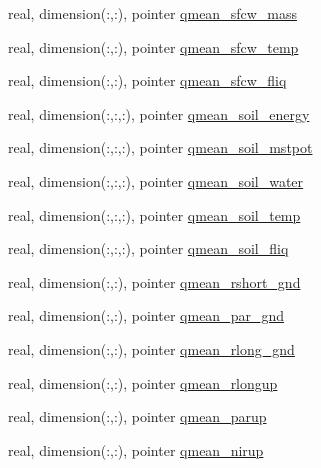 \begin{DoxyCompactItemize}
real, dimension(\+:,\+:), pointer \hyperlink{structed__state__vars_1_1edtype_aaa3a2201b6c25eaf9300a541aeb7d8fb}{qmean\+\_\+sfcw\+\_\+mass}
\item 
real, dimension(\+:,\+:), pointer \hyperlink{structed__state__vars_1_1edtype_ac67ca688691a81933b41003e199160a7}{qmean\+\_\+sfcw\+\_\+temp}
\item 
real, dimension(\+:,\+:), pointer \hyperlink{structed__state__vars_1_1edtype_ad9100ff1e977f24b5cdaf4b8cb18574d}{qmean\+\_\+sfcw\+\_\+fliq}
\item 
real, dimension(\+:,\+:,\+:), pointer \hyperlink{structed__state__vars_1_1edtype_a2fcbe89f1e75f447768d0f403c0e6b6f}{qmean\+\_\+soil\+\_\+energy}
\item 
real, dimension(\+:,\+:,\+:), pointer \hyperlink{structed__state__vars_1_1edtype_a3b45ea7cbbd8fba8041c0edf23517dc9}{qmean\+\_\+soil\+\_\+mstpot}
\item 
real, dimension(\+:,\+:,\+:), pointer \hyperlink{structed__state__vars_1_1edtype_aae05e420e3d423e4929e7f3b5e5cd79a}{qmean\+\_\+soil\+\_\+water}
\item 
real, dimension(\+:,\+:,\+:), pointer \hyperlink{structed__state__vars_1_1edtype_a65b006a88c42265d23c56ebe8f93e9b7}{qmean\+\_\+soil\+\_\+temp}
\item 
real, dimension(\+:,\+:,\+:), pointer \hyperlink{structed__state__vars_1_1edtype_abedf8035a26cf42bb7cad2d0f6b1b358}{qmean\+\_\+soil\+\_\+fliq}
\item 
real, dimension(\+:,\+:), pointer \hyperlink{structed__state__vars_1_1edtype_a6ee891e99b95bfed828ffaa76e259dd3}{qmean\+\_\+rshort\+\_\+gnd}
\item 
real, dimension(\+:,\+:), pointer \hyperlink{structed__state__vars_1_1edtype_ac536a9dca534c8f799348cadf122a25e}{qmean\+\_\+par\+\_\+gnd}
\item 
real, dimension(\+:,\+:), pointer \hyperlink{structed__state__vars_1_1edtype_a649708dc8480219231ec1cfb0c7d51cc}{qmean\+\_\+rlong\+\_\+gnd}
\item 
real, dimension(\+:,\+:), pointer \hyperlink{structed__state__vars_1_1edtype_a73db7247b00fc81221d4c3520502e6d2}{qmean\+\_\+rlongup}
\item 
real, dimension(\+:,\+:), pointer \hyperlink{structed__state__vars_1_1edtype_a1990af85869b2aa09d37fb24fce2ce36}{qmean\+\_\+parup}
\item 
real, dimension(\+:,\+:), pointer \hyperlink{structed__state__vars_1_1edtype_a282b06f417b391000176cd9b160da849}{qmean\+\_\+nirup}
\item 

\end{DoxyCompactItemize}
